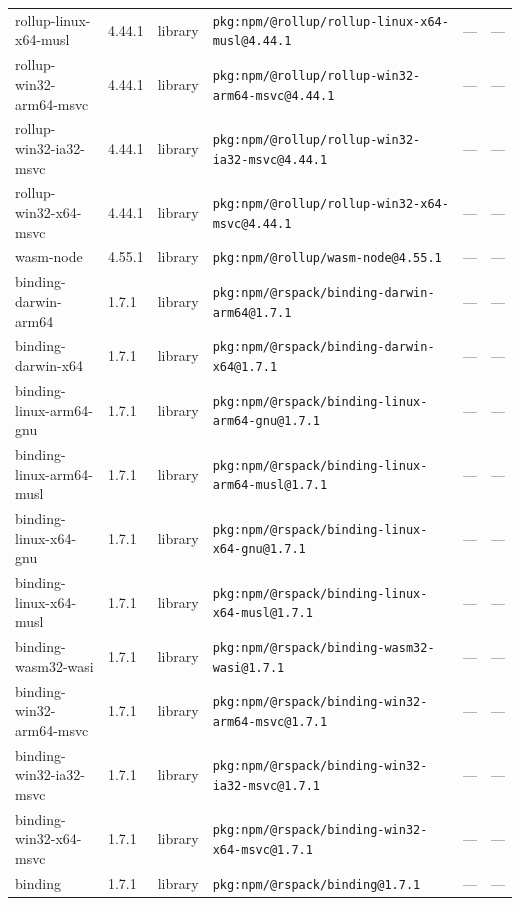 \documentclass[11pt,a4paper]{article}
\begin{document}
\begin{longtable}{|p{4cm}|p{2cm}|p{1.6cm}|p{5cm}|p{1.5cm}|p{3.5cm}|}
\raggedright rollup-linux-x64-musl & 4.44.1 & library & \small\texttt{pkg:npm/@rollup/rollup-linux-x64-musl@4.44.1} & — & \small — \\
\raggedright rollup-win32-arm64-msvc & 4.44.1 & library & \small\texttt{pkg:npm/@rollup/rollup-win32-arm64-msvc@4.44.1} & — & \small — \\
\raggedright rollup-win32-ia32-msvc & 4.44.1 & library & \small\texttt{pkg:npm/@rollup/rollup-win32-ia32-msvc@4.44.1} & — & \small — \\
\raggedright rollup-win32-x64-msvc & 4.44.1 & library & \small\texttt{pkg:npm/@rollup/rollup-win32-x64-msvc@4.44.1} & — & \small — \\
\raggedright wasm-node & 4.55.1 & library & \small\texttt{pkg:npm/@rollup/wasm-node@4.55.1} & — & \small — \\
\raggedright binding-darwin-arm64 & 1.7.1 & library & \small\texttt{pkg:npm/@rspack/binding-darwin-arm64@1.7.1} & — & \small — \\
\raggedright binding-darwin-x64 & 1.7.1 & library & \small\texttt{pkg:npm/@rspack/binding-darwin-x64@1.7.1} & — & \small — \\
\raggedright binding-linux-arm64-gnu & 1.7.1 & library & \small\texttt{pkg:npm/@rspack/binding-linux-arm64-gnu@1.7.1} & — & \small — \\
\raggedright binding-linux-arm64-musl & 1.7.1 & library & \small\texttt{pkg:npm/@rspack/binding-linux-arm64-musl@1.7.1} & — & \small — \\
\raggedright binding-linux-x64-gnu & 1.7.1 & library & \small\texttt{pkg:npm/@rspack/binding-linux-x64-gnu@1.7.1} & — & \small — \\
\raggedright binding-linux-x64-musl & 1.7.1 & library & \small\texttt{pkg:npm/@rspack/binding-linux-x64-musl@1.7.1} & — & \small — \\
\raggedright binding-wasm32-wasi & 1.7.1 & library & \small\texttt{pkg:npm/@rspack/binding-wasm32-wasi@1.7.1} & — & \small — \\
\raggedright binding-win32-arm64-msvc & 1.7.1 & library & \small\texttt{pkg:npm/@rspack/binding-win32-arm64-msvc@1.7.1} & — & \small — \\
\raggedright binding-win32-ia32-msvc & 1.7.1 & library & \small\texttt{pkg:npm/@rspack/binding-win32-ia32-msvc@1.7.1} & — & \small — \\
\raggedright binding-win32-x64-msvc & 1.7.1 & library & \small\texttt{pkg:npm/@rspack/binding-win32-x64-msvc@1.7.1} & — & \small — \\
\raggedright binding & 1.7.1 & library & \small\texttt{pkg:npm/@rspack/binding@1.7.1} & — & \small — \\

\end{longtable}
\end{document}
